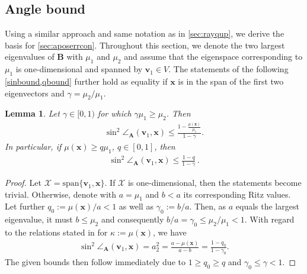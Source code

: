 \documentclass[a4paper,11pt,oneside]{amsart}
\newtheorem{lemma}[theorem]{Lemma}
\theoremstyle{definition}
\theoremstyle{remark}
\newcommand{\ten}[1]{\boldsymbol{#1}}
\numberwithin{equation}{section}
\numberwithin{theorem}{section}
\begin{document}
\begin{appendix}
\subsection{Angle bound}\label{sec:anglebound}
Using a similar approach and same notation as in \cref{sec:rayqup}, we derive the basis for \cref{sec:aposerrcon}. 
%
%
Throughout this section, we denote the two largest eigenvalues of $\ten B$ with $\mu_1$ and $\mu_2$ and assume that the eigenspace corresponding to $\mu_1$ is one-dimensional and spanned by $\ten{v}_1 \in V$. The statements of the following \cref{sinbound,qbound} further hold as equality if $\ten x$ is in the span of the first two eigenvectors and $\gamma = \mu_2 / \mu_1$.
\begin{lemma}\label{sinbound}
Let $\gamma \in [0,1)$ for which $\gamma \mu_1 \geq \mu_2$. Then 
\begin{align*}
 \sin^2 \angle_{\ten A}(\ten{v}_1,\ten x) \leq \frac{1-\frac{\mu(\ten x)}{\mu_1}}{1-\gamma}. 
\end{align*}
In particular, if ${\mu(\ten x)} \geq q \mu_1$, $q \in [0,1]$, then
\begin{align*}
 \sin^2 \angle_{\ten A}(\ten{v}_1,\ten x) \leq \frac{1-q}{1-\gamma}\,.
\end{align*}
\end{lemma}
\begin{proof}
 Let $\mathcal{X} = \mathrm{span}\{\ten v_1, \ten x\}$. If $\mathcal{X}$ is one-dimensional, then the statements become trivial. Otherwise, denote with $a = \mu_1$ and $b < a$ its corresponding Ritz values. Let further 
$q_0 := \mu(\ten x) / a < 1$ as well as $\gamma_0 := b/a$. Then, as $a$ equals the largest eigenvalue, it must $b \leq \mu_2$ and consequently $b /a = \gamma_0 \leq \mu_2 / \mu_1 < 1$. With regard to the relations stated in  for $ \kappa := \mu(\ten x)$, we have
\begin{align}\label{eq:sinqgamma}
 \sin^2 \angle_{\ten A}(\ten{v}_1,\ten x) = a_2^2 = \frac{a - \mu(\ten x)}{a - b} = \frac{1-q_0}{1-\gamma_0}.
\end{align}
The given bounds then follow immediately due to $1 \geq q_0 \geq q$ and $\gamma_0 \leq \gamma < 1$.
\end{proof}



\end{appendix}
\end{document}

